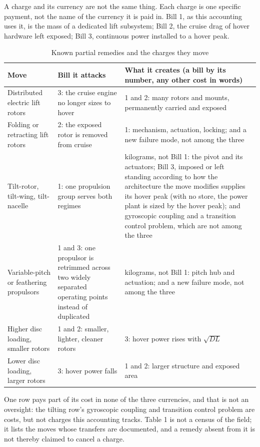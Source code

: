 \documentclass[journal]{new-aiaa}
\begin{document}
A charge and its currency are not the same thing. Each charge is one specific payment, not the name of the currency it is paid in. Bill 1, as this accounting uses it, is the mass of a dedicated lift subsystem; Bill 2, the cruise drag of hover hardware left exposed; Bill 3, continuous power installed to a hover peak.

\begin{table}[htbp]
\centering
\caption{Known partial remedies and the charges they move}
\label{tab:1}
\small
\begin{tabularx}{\linewidth}{XXX}
\hline
Move & Bill it attacks & What it creates (a bill by its number, any other cost in words) \\ \hline
Distributed electric lift rotors & 3: the cruise engine no longer sizes to hover & 1 and 2: many rotors and mounts, permanently carried and exposed \\
Folding or retracting lift rotors & 2: the exposed rotor is removed from cruise & 1: mechanism, actuation, locking; and a new failure mode, not among the three \\
Tilt-rotor, tilt-wing, tilt-nacelle & 1: one propulsion group serves both regimes & kilograms, not Bill 1: the pivot and its actuators; Bill 3, imposed or left standing according to how the architecture the move modifies supplies its hover peak (with no store, the power plant is sized by the hover peak); and gyroscopic coupling and a transition control problem, which are not among the three \\
Variable-pitch or feathering propulsors & 1 and 3: one propulsor is retrimmed across two widely separated operating points instead of duplicated & kilograms, not Bill 1: pitch hub and actuation; and a new failure mode, not among the three \\
Higher disc loading, smaller rotors & 1 and 2: smaller, lighter, cleaner rotors & 3: hover power rises with $\sqrt{DL}$ \\
Lower disc loading, larger rotors & 3: hover power falls & 1 and 2: larger structure and exposed area \\
\hline
\end{tabularx}
\end{table}

One row pays part of its cost in none of the three currencies, and that is not an oversight: the tilting row's gyroscopic coupling and transition control problem are costs, but not charges this accounting tracks. Table 1 is not a census of the field; it lists the moves whose transfers are documented, and a remedy absent from it is not thereby claimed to cancel a charge.
\end{document}
